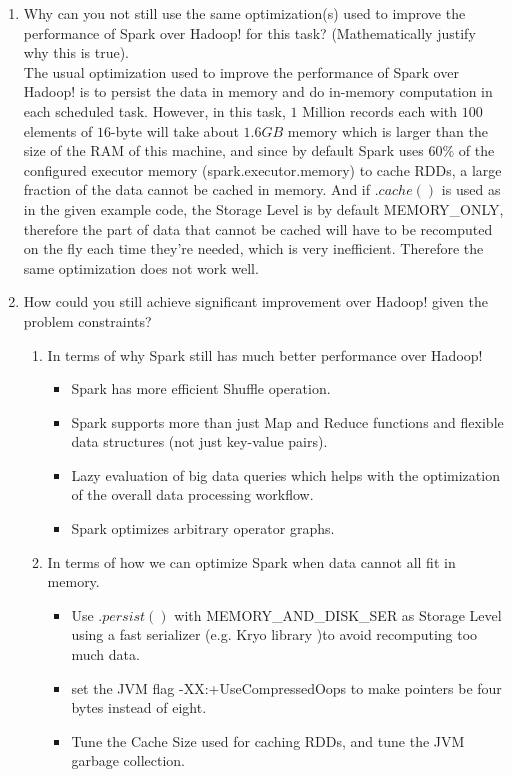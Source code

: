 \documentclass[11 pt, a4paper]{article}  %
\begin{document}
\begin{enumerate}
\begin{enumerate}
\item Why can you not still use the same optimization(s) used to improve the performance of Spark over Hadoop! for this task? (Mathematically justify why this is true).\\

The usual optimization used to improve the performance of Spark over Hadoop! is to persist the data in memory and do in-memory computation in each scheduled task. However, in this task, $1$ Million records each with $100$ elements of $16$-byte will take about $1.6GB$ memory which is larger than the size of the RAM of this machine, and since by default Spark uses $60 \%$ of the configured executor memory (spark.executor.memory) to cache RDDs, a large fraction of the data cannot be cached in memory. And if $.cache()$ is used as in the given example code, the Storage Level is by default MEMORY\_ONLY, therefore the part of data that cannot be cached will have to be recomputed on the fly each time they're needed, which is very inefficient. Therefore the same optimization does not work well.\\


\item How could you still achieve significant improvement over Hadoop! given the problem constraints?\\
\begin{enumerate}
\item In terms of why Spark still has much better performance over Hadoop!
\begin{itemize}
\item Spark has more efficient Shuffle operation.
\item Spark supports more than just Map and Reduce functions and flexible data structures (not just key-value pairs).
\item Lazy evaluation of big data queries which helps with the optimization of the overall data processing workflow.
\item Spark optimizes arbitrary operator graphs.
\end{itemize}

\item In terms of how we can optimize Spark when data cannot all fit in memory. 
\begin{itemize}
\item Use $.persist()$ with MEMORY\_AND\_DISK\_SER as Storage Level using a fast serializer (e.g. Kryo library )to avoid recomputing too much data.
\item set the JVM flag -XX:+UseCompressedOops to make pointers be four bytes instead of eight.
\item Tune the Cache Size used for caching RDDs, and tune the JVM garbage collection.
\end{itemize}
\end{enumerate}


\end{enumerate}
\end{enumerate}
\end{document}
